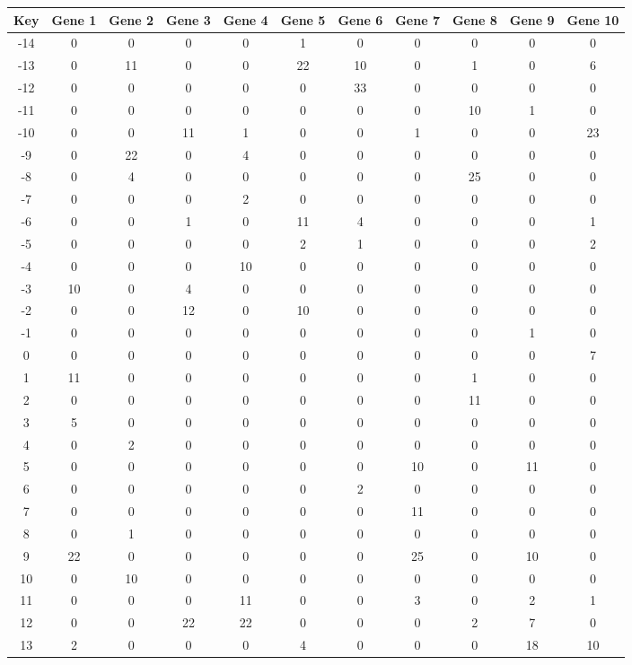 \begin{tabular}{|c|c|c|c|c|c|c|c|c|c|c|}
\hline
Key & Gene 1 & Gene 2 & Gene 3 & Gene 4 & Gene 5 & Gene 6 & Gene 7 & Gene 8 & Gene 9 & Gene 10 \\
\hline
-14 & 0 & 0 & 0 & 0 & 1 & 0 & 0 & 0 & 0 & 0 \\
-13 & 0 & 11 & 0 & 0 & 22 & 10 & 0 & 1 & 0 & 6 \\
-12 & 0 & 0 & 0 & 0 & 0 & 33 & 0 & 0 & 0 & 0 \\
-11 & 0 & 0 & 0 & 0 & 0 & 0 & 0 & 10 & 1 & 0 \\
-10 & 0 & 0 & 11 & 1 & 0 & 0 & 1 & 0 & 0 & 23 \\
-9 & 0 & 22 & 0 & 4 & 0 & 0 & 0 & 0 & 0 & 0 \\
-8 & 0 & 4 & 0 & 0 & 0 & 0 & 0 & 25 & 0 & 0 \\
-7 & 0 & 0 & 0 & 2 & 0 & 0 & 0 & 0 & 0 & 0 \\
-6 & 0 & 0 & 1 & 0 & 11 & 4 & 0 & 0 & 0 & 1 \\
-5 & 0 & 0 & 0 & 0 & 2 & 1 & 0 & 0 & 0 & 2 \\
-4 & 0 & 0 & 0 & 10 & 0 & 0 & 0 & 0 & 0 & 0 \\
-3 & 10 & 0 & 4 & 0 & 0 & 0 & 0 & 0 & 0 & 0 \\
-2 & 0 & 0 & 12 & 0 & 10 & 0 & 0 & 0 & 0 & 0 \\
-1 & 0 & 0 & 0 & 0 & 0 & 0 & 0 & 0 & 1 & 0 \\
0 & 0 & 0 & 0 & 0 & 0 & 0 & 0 & 0 & 0 & 7 \\
1 & 11 & 0 & 0 & 0 & 0 & 0 & 0 & 1 & 0 & 0 \\
2 & 0 & 0 & 0 & 0 & 0 & 0 & 0 & 11 & 0 & 0 \\
3 & 5 & 0 & 0 & 0 & 0 & 0 & 0 & 0 & 0 & 0 \\
4 & 0 & 2 & 0 & 0 & 0 & 0 & 0 & 0 & 0 & 0 \\
5 & 0 & 0 & 0 & 0 & 0 & 0 & 10 & 0 & 11 & 0 \\
6 & 0 & 0 & 0 & 0 & 0 & 2 & 0 & 0 & 0 & 0 \\
7 & 0 & 0 & 0 & 0 & 0 & 0 & 11 & 0 & 0 & 0 \\
8 & 0 & 1 & 0 & 0 & 0 & 0 & 0 & 0 & 0 & 0 \\
9 & 22 & 0 & 0 & 0 & 0 & 0 & 25 & 0 & 10 & 0 \\
10 & 0 & 10 & 0 & 0 & 0 & 0 & 0 & 0 & 0 & 0 \\
11 & 0 & 0 & 0 & 11 & 0 & 0 & 3 & 0 & 2 & 1 \\
12 & 0 & 0 & 22 & 22 & 0 & 0 & 0 & 2 & 7 & 0 \\
13 & 2 & 0 & 0 & 0 & 4 & 0 & 0 & 0 & 18 & 10 \\
\hline
\end{tabular}